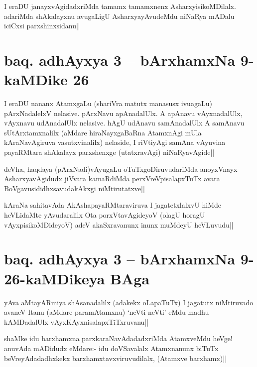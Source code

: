 \begin{artha}
I eraDU janayxvAgidadxriMda tamamx tamamxnenx AsharxyisikoMDilalx. adariMda shAkalayxnu avugaLigU AsharxyayAvudeMdu niNaRya mADalu iciCxsi parxshinxsidanu||
\end{artha}%

\section*{baq. adhAyxya 3 -- bArxhamxNa 9-kaMDike 26}

\stext

\begin{artha}
I eraDU nananx AtamxgaLu (shariVra matutx manasusx ivuagaLu) pArxNadalelxV nelasive. pArxNavu apAnadalUlx. A apAnavu vAyxnadalUlx, vAyxnavu udAnadalUlx nelasive. hAgU udAnavu samAnadalUlx A samAnavu sUtArxtamxnalilx (aMdare hiraNayxgaBaRna AtamxnAgi mUla kAraNavAgiruva vasutxvinalilx) nelaside, I riVtiyAgi samAna vAyuvina payaRMtara shAkalayx parxshenxge (utatxravAgi) niNaRyavAgide||
\end{artha}


\begin{artha}%
deVha, haqdaya (pArxNadi)vAyugaLu oTuTxgoDiruvudariMda anoyxVnayx AsharxyavAgidudx jiVvara kamaRdiMda perxVreVpisalapxTuTx avara BoVgavusididhxsavudakAkxgi niMtirutatxve||
\end{artha}

\begin{artha}
kAraNa sahitavAda AkAshapayaRMtaraviruva I jagatetxlalxvU hiMde heVLidaMte yAvudaralilx Ota porxVtavAgideyoV (olagU horagU vAyxpisikoMDideyoV) adeV akaSxravanunx inunx muMdeyU heVLuvudu||
\end{artha}

\section*{baq. adhAyxya 3 -- bArxhamxNa 9-26-kaMDikeya BAga}

\stext

\begin{artha}
yAva aMtayARmiya shAsanadalilx (adakekx oLapaTuTx) I jagatutx niMtiruvado avaneV Itanu (aMdare paramAtamxnu) `neVti neVti' eMdu madhu kAMDadalUlx vAyxKAyxnisalapxTiTxruvanu||
\end{artha}

\begin{artha}%
shaMke idu barxhamxna parxkaraNavAdadadxriMda AtamxveMdu heVge! anuvAda mADidudx eMdare:- idu doVSavalalx Atamxnanunx biTuTx beVreyAdadadhxkekx barxhamxtavxviruvudilalx, (Atamxve barxhamx)||
\end{artha}

